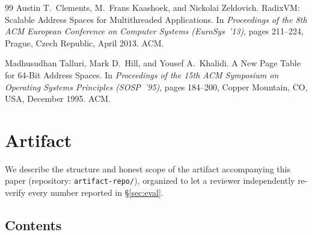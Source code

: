 \documentclass[10pt]{article}
\newcommand{\vfn}[1]{\texttt{#1}}
\begin{document}
\begin{thebibliography}{99}
Austin T.\ Clements, M.\ Frans Kaashoek, and Nickolai Zeldovich.
\newblock RadixVM: Scalable Address Spaces for Multithreaded
Applications.
\newblock In \emph{Proceedings of the 8th ACM European Conference on
Computer Systems (EuroSys~'13)}, pages 211--224, Prague, Czech
Republic, April 2013. ACM.

Madhusudhan Talluri, Mark D.\ Hill, and Yousef A.\ Khalidi.
\newblock A New Page Table for 64-Bit Address Spaces.
\newblock In \emph{Proceedings of the 15th ACM Symposium on Operating
Systems Principles (SOSP~'95)}, pages 184--200, Copper Mountain, CO,
USA, December 1995. ACM.

\end{thebibliography}

\appendix
\section{Artifact}
\label{sec:artifact}

We describe the structure and honest scope of the artifact
accompanying this paper (repository: \vfn{artifact-repo/}), organized
to let a reviewer independently re-verify every number reported in
\S\ref{sec:eval}.

\subsection{Contents}
\end{document}
